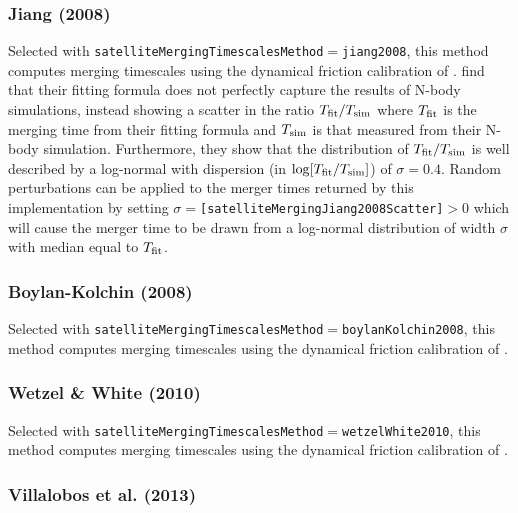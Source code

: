 \subsubsection{Jiang (2008)}\label{phys:satelliteMergingTimescales:satelliteMergingTimescalesJiang2008}

Selected with {\tt satelliteMergingTimescalesMethod}$=${\tt jiang2008}, this method computes merging timescales using the dynamical friction calibration of \cite{jiang_fitting_2008}. \cite{jiang_fitting_2008} find that their fitting formula does not perfectly capture the results of N-body simulations, instead showing a scatter in the ratio $T_{\rm fit}/T_{\rm sim}$ where $T_{\rm fit}$ is the merging time from their fitting formula and $T_{\rm sim}$ is that measured from their N-body simulation. Furthermore, they show that the distribution of $T_{\rm fit}/T_{\rm sim}$ is well described by a log-normal with dispersion (in $\log[T_{\rm fit}/T_{\rm sim}]$) of $\sigma=0.4$. Random perturbations can be applied to the merger times returned by this implementation by setting $\sigma=${\tt [satelliteMergingJiang2008Scatter]}$>0$ which will cause the merger time to be drawn from a log-normal distribution of width $\sigma$ with median equal to $T_{\rm fit}$.


\subsubsection{Boylan-Kolchin (2008)}\label{phys:satelliteMergingTimescales:satelliteMergingTimescalesBoylanKolchin2008}

Selected with {\tt satelliteMergingTimescalesMethod}$=${\tt boylanKolchin2008}, this method computes merging timescales using the dynamical friction calibration of \cite{boylan-kolchin_dynamical_2008}.

\subsubsection{Wetzel \& White (2010)}\label{phys:satelliteMergingTimescales:satelliteMergingTimescalesWetzelWhite2010}

Selected with {\tt satelliteMergingTimescalesMethod}$=${\tt wetzelWhite2010}, this method computes merging timescales using the dynamical friction calibration of \cite{wetzel_what_2010}.

\subsubsection{Villalobos et al. (2013)}\label{phys:satelliteMergingTimescales:satelliteMergingTimescalesVillalobos2013}

